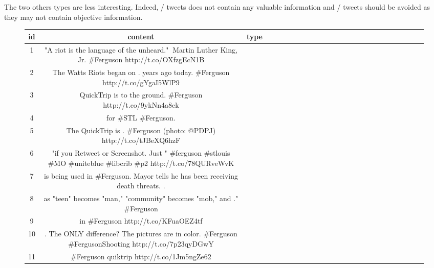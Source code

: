 \documentclass[a4paper,12pt]{report}
\newcommand{\nl}{\tabularnewline\midrule}
\begin{document}
The two others types are less interesting. Indeed, / tweets does not contain any valuable information and / tweets should be avoided as they may not contain objective information.

\begin{figure}[h!]
\centering
\begin{tabular}{c|Cp{3cm}}
id & content & type \nl
1 & "A riot is the language of the unheard." $~$Martin Luther King, Jr. \#Ferguson http://t.co/OXfzgEcN1B &  \newline {} \nl
2 & The Watts Riots began on .   years ago today. \#Ferguson http://t.co/gYgaI5WlP9 &  \newline {} \nl
3 & QuickTrip is  to the ground. \#Ferguson http://t.co/9ykNn4a8ek &  \newline {} \nl
4 &  for \#STL \#Ferguson. &  \newline {} \nl
5 & The QuickTrip is  . \#Ferguson (photo: @PDPJ) http://t.co/tJBeXQ6hzF &  \newline {} \nl
6 & "if you Retweet or Screenshot. Just  " \#ferguson \#stlouis \#MO  \#uniteblue \#libcrib \#p2 http://t.co/78QURveWvK &  \newline {}  \nl
7 &  is being used in \#Ferguson.  Mayor tells  he has been receiving death threats. . &  \newline {} \nl
8 &  as "teen" becomes "man," "community" becomes "mob," and ." \#Ferguson  &  \newline {} \nl
9 &  in \#Ferguson http://t.co/KFuaOEZ4tf &  \newline {} \nl
10 & . The ONLY difference?  The pictures are in color.  \#Ferguson \#FergusonShooting http://t.co/7p23qyDGwY &  \newline {} \nl
11 & \#Ferguson quiktrip  http://t.co/1Jm5ngZe62 &  \newline {} \nl

\end{tabular}
\end{figure}
\end{document}

